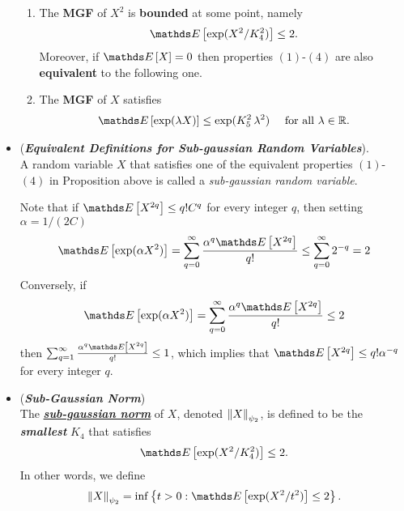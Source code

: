 \documentclass[11pt]{article}
\begin{document}
\begin{itemize}
\begin{proposition}
\begin{enumerate}
\item The \textbf{MGF} of $X^2$ is \textbf{bounded} at some point, namely
\begin{align*}
\E{}{\exp(X^2 / K_4^2)} \le 2.
\end{align*}
Moreover, if $\E{}{X} = 0$ then properties $(1)$-$(4)$ are also \textbf{equivalent} to the following one.

\item The \textbf{MGF} of $X$ satisfies
\begin{align*}
\E{}{\exp(\lambda X)} \le  \exp(K_5^2\,\lambda^2)\quad\text{ for all }\lambda \in \bR.
\end{align*}
\end{enumerate}
\end{proposition}

\item \begin{remark} (\textbf{\emph{Equivalent Definitions for Sub-gaussian Random Variables}}). \\
A random variable $X$ that satisfies one of the equivalent properties $(1)$-$(4)$ in Proposition above is called a \emph{sub-gaussian random variable}. 

Note that if $\E{}{X^{2q}} \le  q! C^q$ for every integer $q$, then setting $\alpha = 1/(2C)$
\begin{align*}
\E{}{\exp(\alpha X^2)} = \sum_{q=0}^{\infty}\frac{\alpha^q \E{}{X^{2q}}}{q!} \le  \sum_{q=0}^{\infty}2^{-q} = 2
\end{align*} Conversely, if
\begin{align*}
\E{}{\exp(\alpha X^2)} = \sum_{q=0}^{\infty}\frac{\alpha^q \E{}{X^{2q}}}{q!} \le 2
\end{align*} then $ \sum_{q=1}^{\infty}\frac{\alpha^q \E{}{X^{2q}}}{q!} \le 1$, which implies that $\E{}{X^{2q}} \le  q! \alpha^{-q}$ for every integer $q$.
\end{remark}

\item \begin{definition} (\textbf{\emph{Sub-Gaussian Norm}}) \\
The \underline{\emph{\textbf{sub-gaussian norm}}} of $X$, denoted $\left\|X\right\|_{\psi_2}$, is defined
to be the \emph{\textbf{smallest}} $K_4$ that satisfies 
\begin{align*}
\E{}{\exp(X^2 / K_4^2)} \le 2.
\end{align*} In other words, we define
\begin{align}
\norm{X}{\psi_2}= \inf\set{t > 0: \E{}{\exp(X^2 / t^2)} \le 2}.  \label{eqn: sub_gaussian_norm}
\end{align}
\end{definition}


\end{itemize}
\end{document}

